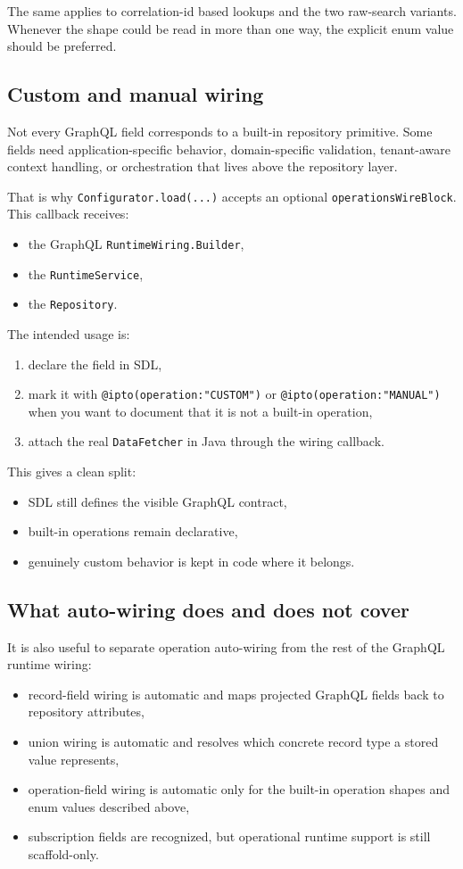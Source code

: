 The same applies to correlation-id based lookups and the two raw-search variants. Whenever the shape could be read in more than one way, the explicit enum value should be preferred.

\subsection{Custom and manual wiring}

Not every GraphQL field corresponds to a built-in repository primitive. Some fields need application-specific behavior, domain-specific validation, tenant-aware context handling, or orchestration that lives above the repository layer.

That is why \texttt{Configurator.load(...)} accepts an optional \texttt{operationsWireBlock}. This callback receives:
\begin{itemize}
\item the GraphQL \texttt{RuntimeWiring.Builder},
\item the \texttt{RuntimeService},
\item the \texttt{Repository}.
\end{itemize}

The intended usage is:
\begin{enumerate}
\item declare the field in SDL,
\item mark it with \texttt{@ipto(operation:"CUSTOM")} or \texttt{@ipto(operation:"MANUAL")} when you want to document that it is not a built-in operation,
\item attach the real \texttt{DataFetcher} in Java through the wiring callback.
\end{enumerate}

This gives a clean split:
\begin{itemize}
\item SDL still defines the visible GraphQL contract,
\item built-in operations remain declarative,
\item genuinely custom behavior is kept in code where it belongs.
\end{itemize}

\subsection{What auto-wiring does and does not cover}

It is also useful to separate operation auto-wiring from the rest of the GraphQL runtime wiring:
\begin{itemize}
\item record-field wiring is automatic and maps projected GraphQL fields back to repository attributes,
\item union wiring is automatic and resolves which concrete record type a stored value represents,
\item operation-field wiring is automatic only for the built-in operation shapes and enum values described above,
\item subscription fields are recognized, but operational runtime support is still scaffold-only.
\end{itemize}

